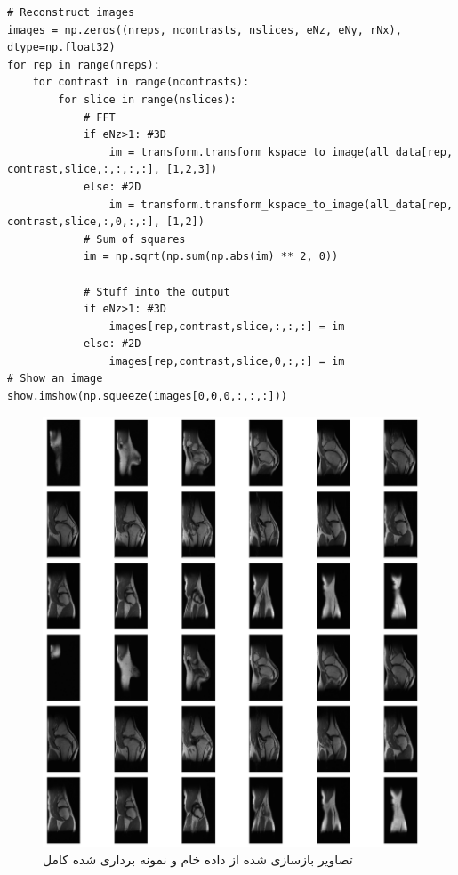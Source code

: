 \begin{latin}
\begin{lstlisting}
# Reconstruct images
images = np.zeros((nreps, ncontrasts, nslices, eNz, eNy, rNx), dtype=np.float32)
for rep in range(nreps):
	for contrast in range(ncontrasts):
		for slice in range(nslices):
			# FFT
			if eNz>1: #3D
				im = transform.transform_kspace_to_image(all_data[rep, contrast,slice,:,:,:,:], [1,2,3])
			else: #2D
				im = transform.transform_kspace_to_image(all_data[rep, contrast,slice,:,0,:,:], [1,2])
			# Sum of squares
			im = np.sqrt(np.sum(np.abs(im) ** 2, 0))
				
			# Stuff into the output
			if eNz>1: #3D
				images[rep,contrast,slice,:,:,:] = im
			else: #2D
				images[rep,contrast,slice,0,:,:] = im
# Show an image
show.imshow(np.squeeze(images[0,0,0,:,:,:]))
\end{lstlisting}
\end{latin}


\begin{figure}[t!]
	\centering
	\includegraphics[width=0.7\linewidth]{chapters/chapter-4/figs/result-36-plots-data-load}
	\caption{تصاویر بازسازی شده از داده خام و نمونه برداری شده کامل}
	\label{fig:result-36-plots-data-load}
\end{figure}
